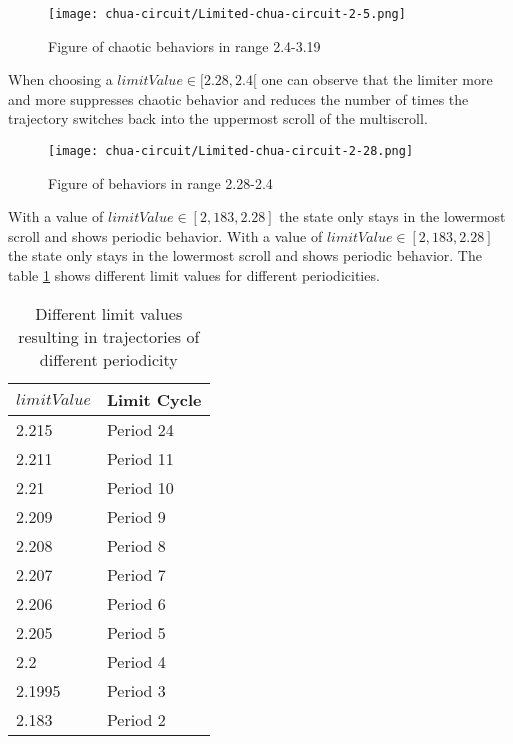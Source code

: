 \documentclass[main]{subfiles}
\begin{document}
\begin{figure}[!h]
\centering
\texttt{[image: chua-circuit/Limited-chua-circuit-2-5.png]}
\caption[Figure of chaotic behaviors in range 2.4-3.19]{Figure of chaotic behaviors in range 2.4-3.19}
\label{figure:chaotictrajectories}
\end{figure}

When choosing a \(limitValue \in [2.28,2.4[\) one can observe that the limiter more and more suppresses chaotic behavior and reduces the number of times the trajectory switches back into the uppermost scroll of the multiscroll.

\begin{figure}[!h]
\centering
\texttt{[image: chua-circuit/Limited-chua-circuit-2-28.png]}
\caption[Figure of behaviors in range 2.28-2.4]{Figure of behaviors in range 2.28-2.4}
\label{figure:chaotictrajectories}
\end{figure}

With a value of \(limitValue \in [2,183, 2.28]\) the state only stays in the lowermost scroll and shows periodic behavior. With a value of \(limitValue \in [2,183, 2.28]\) the state only stays in the lowermost scroll and shows periodic behavior. The table \ref{table:periodicities} shows different limit values for different periodicities.

\begin{comment}
\begin{table}
\center
\begin{tabular}{|l|l|l|l|l|l|l|l|l|l|l|l|l|}
   \hline
   limitValue & 2.215 & 2.211 & 2.2105 & 2.2101 & 2.2101 &  2.208 & 2.207 & 2.206 & 2.205 & 2.1995 & 2.183 \\
   \hline
   Limit Cycle Period & 24 & 11 & 9 & 8 & 7 & 6 & 5 & 4 & 3 & 2 \\
   \hline
\end{tabular}
\caption{Whatever}
\label{table:periodicities}
\end{table}
\end{comment}

\begin{table}[H]
\renewcommand{\arraystretch}{1.2}
\center
\begin{tabular}{@{}ll@{}}
	\toprule
   \(limitValue\) & Limit Cycle\\
   \midrule
   2.215 & Period 24 \\ 
   2.211 & Period 11 \\
   2.21  & Period 10 \\
   2.209 & Period 9 \\
   2.208 & Period 8 \\
   2.207 & Period 7 \\
   2.206 & Period 6 \\
   2.205 & Period 5 \\
   2.2 & Period 4 \\
   2.1995 & Period 3 \\
   2.183 & Period 2 \\
   \bottomrule
\end{tabular}
\caption{Different limit values resulting in trajectories of different periodicity}
\label{table:periodicities}
\end{table}
\end{document}
